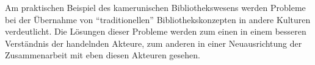 Am praktischen Beispiel des kamerunischen Bibliothekswesens werden
Probleme bei der Übernahme von ``traditionellen'' Bibliothekskonzepten
in andere Kulturen verdeutlicht. Die Lösungen dieser Probleme werden zum
einen in einem besseren Verständnis der handelnden Akteure, zum anderen
in einer Neuausrichtung der Zusammenarbeit mit eben diesen Akteuren
gesehen.
